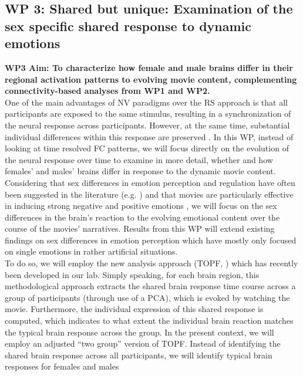 \documentclass[11pt,a4paper]{article}
\begin{document}
\subsection*{WP 3: Shared but unique: Examination of the sex specific shared response to dynamic emotions}
\textbf{WP3 Aim: To characterize how female and male brains differ in their regional activation patterns to
evolving movie content, complementing connectivity-based analyses from WP1 and WP2.}\\
One of the main advantages of NV paradigms over the RS approach is that all participants are exposed to
the same stimulus, resulting in a synchronization of the neural response across participants. However, at
the same time, substantial individual differences within this 
response are preserved \parencite{finnIdiosynchronySharedResponses2020a,vanderwalIndividualDifferencesFunctional2017}. 
In this WP, instead of looking at time resolved FC patterns, we will focus directly
on the evolution of the neural response over time to examine in more detail, whether and how females' and
males' brains differ in response to the dynamic movie content. Considering that sex differences in emotion
perception and regulation have often been suggested in the literature 
(e.g. \parencite{domesNeuralCorrelatesSex2010a,gardenerSexDifferencesEmotion2013a})
and that movies are particularly effective in inducing strong negative and positive emotions
\parencite{grossEmotionElicitationUsing1995,westermannRelativeEffectivenessValidity1996}, we will 
focus on the sex differences in the brain's reaction
to the evolving emotional content over the course of the movies' narratives. Results from this WP will
extend existing findings on sex differences in emotion perception which have mostly only focused on single
emotions in rather artificial situations.\\
To do so, we will employ the new analysis approach (TOPF, \parencite{liTopographybasedPredictiveFramework2023a}) 
which has recently been developed in our lab. Simply speaking, for each brain region, this
methodological approach extracts the
shared brain response time course across a group of participants (through use of a PCA), which is evoked
by watching the movie. Furthermore, the individual expression of this shared response is computed, which
indicates to what extent the individual brain reaction matches the typical brain response across the group.
In the present context, we will employ an adjusted “two group” version of TOPF. Instead of identifying the
shared brain response across all participants, we will identify typical brain responses for females and males
\end{document}
